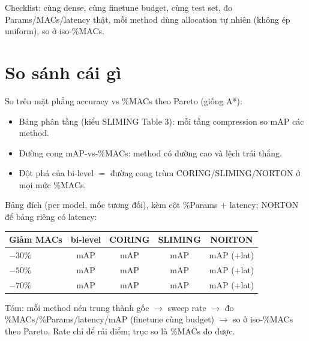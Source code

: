 \documentclass[11pt,a4paper]{article}
\begin{document}
Checklist: cùng dense, cùng finetune budget, cùng test set, đo Params/MACs/latency thật, mỗi method
dùng allocation tự nhiên (không ép uniform), so ở iso-\%MACs.

\section{So sánh cái gì}

So trên mặt phẳng accuracy vs \%MACs theo Pareto (giống A*):
\begin{itemize}
  \item Bảng phân tầng (kiểu SLIMING Table 3): mỗi tầng compression so mAP các method.
  \item Đường cong mAP-vs-\%MACs: method có đường cao và lệch trái thắng.
  \item Đột phá của bi-level $=$ đường cong trùm CORING/SLIMING/NORTON ở mọi mức \%MACs.
\end{itemize}

Bảng đích (per model, mốc tương đối), kèm cột \%Params $+$ latency; NORTON để bảng riêng có latency:
\begin{center}
\begin{tabular}{@{}lcccc@{}}
\hline
Giảm MACs & bi-level & CORING & SLIMING & NORTON\\
\hline
$-30\%$ & mAP & mAP & mAP & mAP (+lat)\\
$-50\%$ & mAP & mAP & mAP & mAP (+lat)\\
$-70\%$ & mAP & mAP & mAP & mAP (+lat)\\
\hline
\end{tabular}
\end{center}

Tóm: mỗi method nén trung thành gốc $\to$ sweep rate $\to$ đo \%MACs/\%Params/latency/mAP (finetune
cùng budget) $\to$ so ở iso-\%MACs theo Pareto. Rate chỉ để rải điểm; trục so là \%MACs đo được.
\end{document}
